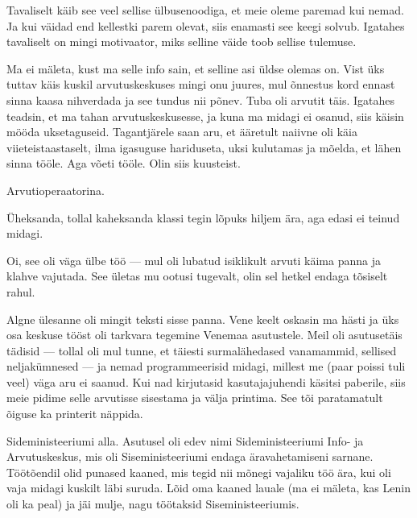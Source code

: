 
Tavaliselt käib see veel sellise ülbusenoodiga, et meie oleme 
paremad kui nemad. Ja kui väidad end kellestki parem olevat, siis 
enamasti see keegi solvub. Igatahes tavaliselt on mingi motivaator, miks 
selline väide toob sellise tulemuse. 


Ma ei mäleta, kust ma selle info sain, et selline asi üldse olemas on. Vist 
üks tuttav käis kuskil arvutuskeskuses mingi onu juures, mul õnnestus kord ennast 
sinna kaasa nihverdada ja see tundus nii põnev. Tuba oli arvutit täis. Igatahes 
teadsin, et ma tahan arvutuskeskusesse, ja kuna ma midagi ei osanud, siis 
käisin mööda uksetaguseid. Tagantjärele saan aru, et ääretult naiivne 
oli käia viieteistaastaselt, ilma igasuguse 
hariduseta, uksi kulutamas ja mõelda, et lähen sinna tööle. Aga võeti tööle. Olin siis kuusteist.


Arvutioperaatorina. 


Üheksanda, tollal kaheksanda klassi tegin lõpuks hiljem ära, aga edasi ei 
teinud midagi. 


Oi, see oli väga ülbe töö --- mul oli lubatud isiklikult 
arvuti käima panna ja klahve vajutada. See ületas mu ootusi tugevalt, olin sel 
hetkel endaga tõsiselt rahul. 

Algne ülesanne oli mingit teksti sisse panna. Vene keelt oskasin ma hästi ja 
üks osa keskuse tööst oli tarkvara tegemine Venemaa 
asutustele. Meil oli asutusetäis tädisid --- tollal oli mul tunne, et täiesti 
surmalähedased vanamammid, sellised neljakümnesed --- ja 
nemad programmeerisid midagi, millest me (paar 
poissi tuli veel) väga aru ei saanud. Kui nad kirjutasid kasutajajuhendi käsitsi paberile, siis meie pidime selle 
arvutisse sisestama ja välja printima. See tõi paratamatult õiguse ka
printerit näppida.


Sideministeeriumi alla. Asutusel oli edev nimi 
Sideministeeriumi Info- ja Arvutuskeskus, mis oli Siseministeeriumi endaga äravahetamiseni sarnane. 
Töötõendil olid punased kaaned, mis tegid nii mõnegi vajaliku 
töö ära, kui oli vaja midagi kuskilt läbi suruda. Lõid oma kaaned lauale (ma ei mäleta, kas Lenin oli ka peal)
ja jäi mulje, nagu töötaksid Siseministeeriumis. 

